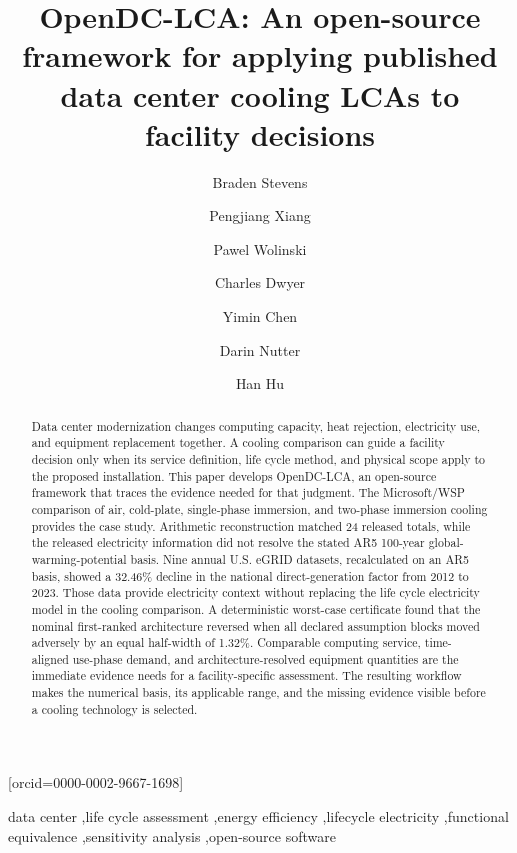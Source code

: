 \documentclass[review,a4paper,fleqn]{cas-sc}
\begin{document}
\title[mode=title]{OpenDC-LCA: An open-source framework for applying published data center cooling LCAs to facility decisions}
\author[uark,hfa]{Braden Stevens}
\author[uark,hfa]{Pengjiang Xiang}
\author[ahpcc]{Pawel Wolinski}
\author[its]{Charles Dwyer}
\author[ornl]{Yimin Chen}
\author[uark]{Darin Nutter}
\author[uark]{Han Hu}[orcid=0000-0002-9667-1698]
\cormark[1]
\begin{abstract}
Data center modernization changes computing capacity, heat rejection, electricity use, and equipment replacement together. A cooling comparison can guide a facility decision only when its service definition, life cycle method, and physical scope apply to the proposed installation. This paper develops OpenDC-LCA, an open-source framework that traces the evidence needed for that judgment. The Microsoft/WSP comparison of air, cold-plate, single-phase immersion, and two-phase immersion cooling provides the case study. Arithmetic reconstruction matched 24 released totals, while the released electricity information did not resolve the stated AR5 100-year global-warming-potential basis. Nine annual U.S. eGRID datasets, recalculated on an AR5 basis, showed a 32.46\% decline in the national direct-generation factor from 2012 to 2023. Those data provide electricity context without replacing the life cycle electricity model in the cooling comparison. A deterministic worst-case certificate found that the nominal first-ranked architecture reversed when all declared assumption blocks moved adversely by an equal half-width of 1.32\%. Comparable computing service, time-aligned use-phase demand, and architecture-resolved equipment quantities are the immediate evidence needs for a facility-specific assessment. The resulting workflow makes the numerical basis, its applicable range, and the missing evidence visible before a cooling technology is selected.

\end{abstract}
\begin{keywords}
data center \sep life cycle assessment \sep energy efficiency \sep lifecycle electricity \sep functional equivalence \sep sensitivity analysis \sep open-source software
\end{keywords}
\maketitle
\end{document}
